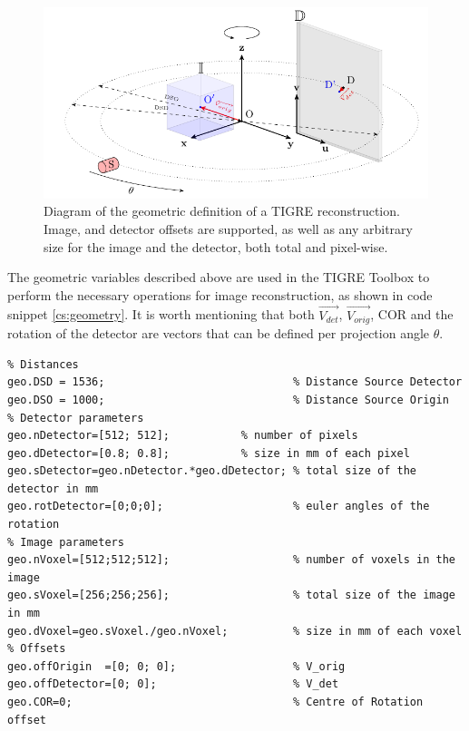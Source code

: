 \begin{figure}
\begin{center}

\includegraphics{GPUmethods/geometrytikz-figure0.pdf} 
\end{center}

\caption[Diagram of the geometry of TIGRE]{\label{fig:geometryTIGRE} Diagram of the geometric definition of a TIGRE reconstruction. Image, and detector offsets are supported, as well as any arbitrary size for the image and the detector, both total and pixel-wise.} 
\end{figure}

The geometric variables described above are used in the TIGRE Toolbox to perform the necessary operations for image reconstruction, as shown in code snippet \ref{cs:geometry}. It is worth mentioning that both $\overrightarrow{V_{det}}$, $\overrightarrow{V_{orig}}$, COR and the rotation of the detector are vectors that can be defined per projection angle $\theta$.
\FloatBarrier
\begin{lstlisting}[style=Matlab-editor,
basicstyle=\scriptsize,
caption= Geometry definition in TIGRE,
label={cs:geometry},
frame = single
]
%% Geometry structure definition.
% Distances
geo.DSD = 1536;                      	    % Distance Source Detector
geo.DSO = 1000;                     	    % Distance Source Origin
% Detector parameters
geo.nDetector=[512; 512];		    % number of pixels 
geo.dDetector=[0.8; 0.8]; 		    % size in mm of each pixel
geo.sDetector=geo.nDetector.*geo.dDetector; % total size of the detector in mm
geo.rotDetector=[0;0;0];                    % euler angles of the rotation 
% Image parameters
geo.nVoxel=[512;512;512];                   % number of voxels in the image
geo.sVoxel=[256;256;256];                   % total size of the image in mm
geo.dVoxel=geo.sVoxel./geo.nVoxel;          % size in mm of each voxel
% Offsets
geo.offOrigin  =[0; 0; 0];                  % V_orig
geo.offDetector=[0; 0];                     % V_det
geo.COR=0;                                  % Centre of Rotation offset

\end{lstlisting}

